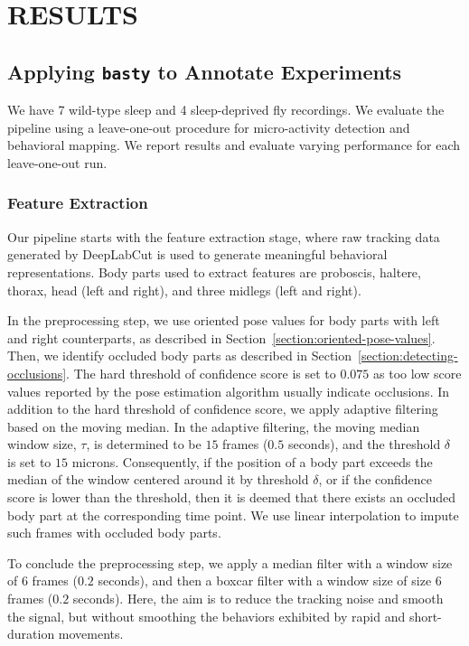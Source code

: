 \setlength{\parindent}{0pt}
\chapter{\bf RESULTS}\label{chapter:results}
\section{Applying \texttt{basty} to Annotate Experiments}\label{section:applying-proposed-pipeline}
We have 7 wild-type sleep and 4 sleep-deprived fly recordings.
We evaluate the pipeline using a leave-one-out procedure for micro-activity detection and behavioral mapping.
We report results and evaluate varying performance for each leave-one-out run.

\subsection{Feature Extraction}
Our pipeline starts with the feature extraction stage, where raw tracking data generated by DeepLabCut is used to generate meaningful behavioral representations.
Body parts used to extract features are proboscis, haltere, thorax, head (left and right), and three midlegs (left and right).

In the preprocessing step, we use oriented pose values for body parts with left and right counterparts, as described in Section~\ref{section:oriented-pose-values}.
Then, we identify occluded body parts as described in Section~\ref{section:detecting-occlusions}.
The hard threshold of confidence score is set to $0.075$ as too low score values reported by the pose estimation algorithm usually indicate occlusions.
In addition to the hard threshold of confidence score, we apply adaptive filtering based on the moving median.
In the adaptive filtering, the moving median window size, $\tau$, is determined to be $15$ frames ($0.5$ seconds), and the threshold $\delta$ is set to $15$ microns.
Consequently, if the position of a body part exceeds the median of the window centered around it by threshold $\delta$, or if the confidence score is lower than the threshold, then it is deemed that there exists an occluded body part at the corresponding time point.
We use linear interpolation to impute such frames with occluded body parts.

To conclude the preprocessing step, we apply a median filter with a window size of $6$ frames ($0.2$ seconds), and then a boxcar filter with a window size of size $6$ frames ($0.2$ seconds).
Here, the aim is to reduce the tracking noise and smooth the signal, but without smoothing the behaviors exhibited by rapid and short-duration movements.

